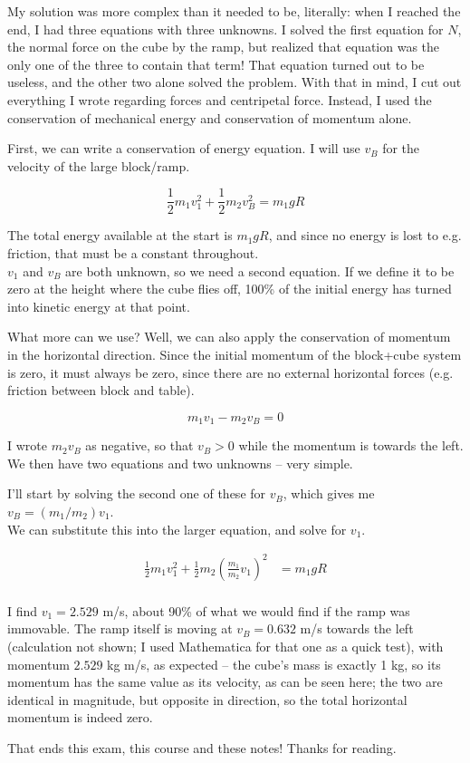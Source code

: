 \documentclass[8.01x]{subfiles}
\begin{document}
My solution was more complex than it needed to be, literally: when I reached the end, I had three equations with three unknowns. I solved the first equation for $N$, the normal force on the cube by the ramp, but realized that equation was the only one of the three to contain that term! That equation turned out to be useless, and the other two alone solved the problem. With that in mind, I cut out everything I wrote regarding forces and centripetal force. Instead, I used the conservation of mechanical energy and conservation of momentum alone.

First, we can write a conservation of energy equation. I will use $v_B$ for the velocity of the large block/ramp.

\begin{equation}
\frac{1}{2} m_1 v_1^2 + \frac{1}{2} m_2 v_B^2 = m_1 g R
\end{equation}

The total energy available at the start is $m_1 g R$, and since no energy is lost to e.g. friction, that must be a constant throughout.\\
$v_1$ and $v_B$ are both unknown, so we need a second equation. If we define it to be zero at the height where the cube flies off, 100\% of the initial energy has turned into kinetic energy at that point.

What more can we use? Well, we can also apply the conservation of momentum in the horizontal direction. Since the initial momentum of the block+cube system is zero, it must always be zero, since there are no external horizontal forces (e.g. friction between block and table).

\begin{equation}
m_1 v_1 - m_2 v_B = 0
\end{equation}

I wrote $m_2 v_B$ as negative, so that $v_B > 0$ while the momentum is towards the left.\\
We then have two equations and two unknowns -- very simple.

I'll start by solving the second one of these for $v_B$, which gives me $v_B = (m_1/m_2) v_1$.\\
We can substitute this into the larger equation, and solve for $v_1$.

\begin{align}
\frac{1}{2} m_1 v_1^2 + \frac{1}{2} m_2 \left(\frac{m_1}{m_2} v_1\right)^2 &= m_1 g R\\
\end{align}

I find $v_1 = 2.529$ m/s, about 90\% of what we would find if the ramp was immovable. The ramp itself is moving at $v_B = 0.632$ m/s towards the left (calculation not shown; I used Mathematica for that one as a quick test), with momentum $2.529$ kg m/s, as expected -- the cube's mass is exactly 1 kg, so its momentum has the same value as its velocity, as can be seen here; the two are identical in magnitude, but opposite in direction, so the total horizontal momentum is indeed zero.

That ends this exam, this course and these notes! Thanks for reading.
\end{document}
